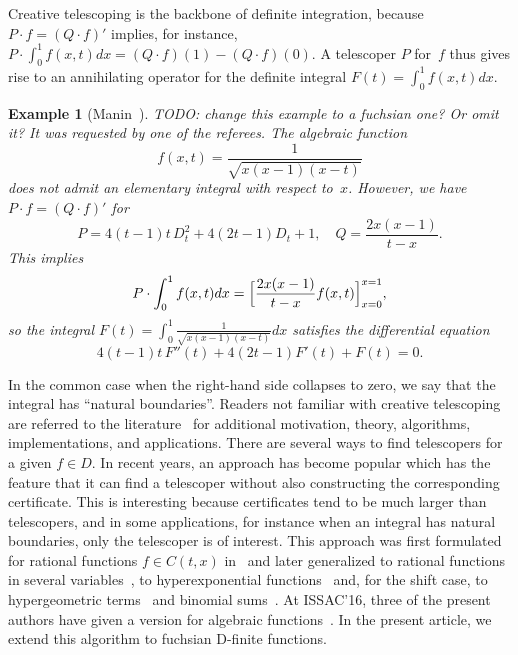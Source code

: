 \documentclass{sig-alternate}
\newtheorem{example}[theorem]{Example}
\newcommand{\red}{\color{red}}
\newcommand{\todo}[1]{{\red TODO: #1}}
\begin{document}
Creative telescoping is the backbone of definite integration, because
$P\cdot f=(Q\cdot f)'$ implies, for instance, $P\cdot\int_0^1 f(x,t)dx = (Q\cdot f)(1) - (Q\cdot f)(0)$.
A telescoper $P$ for~$f$ thus gives rise to an annihilating operator for the
definite integral $F(t)=\int_0^1 f(x,t)dx$.
\begin{example}[Manin~\cite{manin1958}]
  \todo{change this example to a fuchsian one? Or omit it? It was requested by one of the referees.}
  The algebraic function
  \[
    f(x,t)=\frac1{\sqrt{x(x-1)(x-t)}}
  \]
  does not admit an elementary integral with respect to~$x$.
  However, we have $P\cdot f=(Q\cdot f)'$ for
  \[
    P=4(t-1)t\,D_t^2 + 4(2t-1)D_t+1,\quad Q=\frac{2x(x-1)}{t-x}.
  \]
  This implies
  \[
    P\cdot \int_0^1 f(x,t)dx = \Bigl[\frac{2x(x-1)}{t-x}f(x,t)\Bigr]_{x=0}^{x=1},
  \]
  so the integral $F(t)=\int_0^1\frac1{\sqrt{x(x-1)(x-t)}}dx$ satisfies the differential equation
  \[
    4(t-1)t\,F''(t) + 4(2t-1)F'(t) + F(t) = 0.
  \]
\end{example}
In the common case when the right-hand side
collapses to zero, we say that the integral has ``natural boundaries''. Readers not
familiar with creative telescoping are referred to the
literature~\cite{PWZbook1996,Zeilberger1990c,Zeilberger1991,Zeilberger1990,Koepf1998,kauers11}
for additional motivation, theory, algorithms, implementations, and applications. There are
several ways to find telescopers for a given $f\in D$. In recent years, an
approach has become popular which has the feature that it can find a telescoper
without also constructing the corresponding certificate. This is interesting
because certificates tend to be much larger than telescopers, and in some
applications, for instance when an integral has natural boundaries, only the telescoper is of interest. This approach was first
formulated for rational functions $f\in C(t,x)$ in~\cite{BCCL2010} and later
generalized to rational functions in several variables~\cite{bostan13,lairez16}, to
hyperexponential functions~\cite{bostan13a} and, for the shift case, to hypergeometric
terms~\cite{chen15a,huang16} and binomial sums~\cite{bostan16}.
At ISSAC'16, three of the present authors have given a version for algebraic functions~\cite{chen16}.
In the present article, we extend this algorithm to fuchsian D-finite functions.
\end{document}
